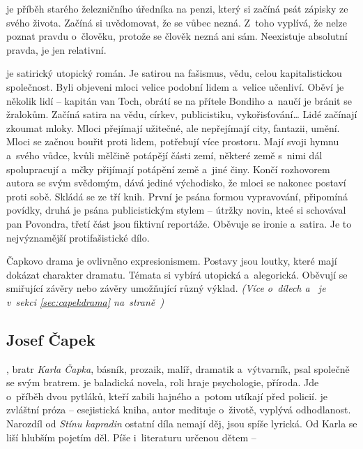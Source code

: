  je příběh starého železničního úředníka na penzi,
který si začíná psát zápisky ze svého života. Začíná si uvědomovat, že
se vůbec nezná. Z~toho vyplívá, že nelze poznat pravdu o~člověku,
protože se člověk nezná ani sám. Neexistuje absolutní pravda, je jen
relativní.

 je satirický utopický román. Je satirou na fašismus,
vědu, celou kapitalistickou společnost. Byli objeveni mloci velice
podobní lidem a~velice učenliví. Oběví je několik lidí -- kapitán van
Toch, obrátí se na přítele Bondiho a~naučí je bránit se žralokům. Začíná
satira na vědu, církev, publicistiku, vykořisťování\dots{} Lidé začínají
zkoumat mloky. Mloci přejímají užitečné, ale nepřejímají city, fantazii,
umění. Mloci se začnou bouřit proti lidem, potřebují více prostoru. Mají
svoji hymnu a~svého vůdce, kvůli mělčině potápějí části zemí, některé
země s~nimi dál spolupracují a~mčky přijímají potápění země a~jiné činy.
Končí rozhovorem autora se svým svědomým, dává jediné východisko, že
mloci se nakonec postaví proti sobě. Skládá se ze tří knih. První je
psána formou vypravování, připomíná povídky, druhá je psána
publicistickým stylem -- útržky novin, kteé si schovával pan Povondra,
třetí část jsou fiktivní reportáže. Oběvuje se ironie a~satira. Je to
nejvýznamější protifašistické dílo.


Čapkovo drama je ovlivněno expresionismem. Postavy jsou loutky, které
mají dokázat charakter dramatu. Témata si vybírá utopická a~alegorická.
Oběvují se smiřující závěry nebo závěry umožňující různý výklad. \emph{(Více
o~dílech   
a~ je v~sekci \ref{sec:capekdrama} na~straně~\pageref{sec:capekdrama})}

\subsection*{Josef Čapek}
, bratr \emph{Karla Čapka}, básník, prozaik, malíř,
dramatik a~výtvarník, psal společně se svým bratrem.  je baladická novela, roli hraje psychologie, příroda. Jde
o~příběh dvou pytláků, kteří zabili hajného a~potom utíkají před policií.
 je zvláštní próza -- esejistická kniha, autor
medituje o~životě, vyplývá odhodlanost. Narozdíl od \emph{Stínu
kapradin} ostatní díla nemají děj, jsou spíše lyrická. Od Karla se liší
hlubším pojetím děl. Píše i~literaturu určenou dětem -- 

